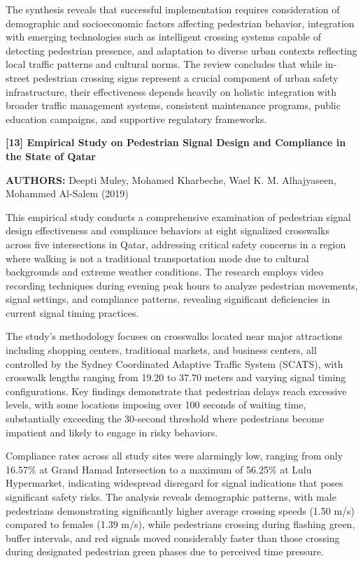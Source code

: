\documentclass[a4paper, 12pt]{report}
\begin{document}
The synthesis reveals that successful implementation requires consideration of demographic and socioeconomic factors affecting pedestrian behavior, integration with emerging technologies such as intelligent crossing systems capable of detecting pedestrian presence, and adaptation to diverse urban contexts reflecting local traffic patterns and cultural norms. The review concludes that while in-street pedestrian crossing signs represent a crucial component of urban safety infrastructure, their effectiveness depends heavily on holistic integration with broader traffic management systems, consistent maintenance programs, public education campaigns, and supportive regulatory frameworks.

\noindent \textbf{[13] Empirical Study on Pedestrian Signal Design and Compliance in the State of Qatar}

\textbf{AUTHORS:} Deepti Muley, Mohamed Kharbeche, Wael K. M. Alhajyaseen, Mohammed Al-Salem (2019)



This empirical study conducts a comprehensive examination of pedestrian signal design effectiveness and compliance behaviors at eight signalized crosswalks across five intersections in Qatar, addressing critical safety concerns in a region where walking is not a traditional transportation mode due to cultural backgrounds and extreme weather conditions. The research employs video recording techniques during evening peak hours to analyze pedestrian movements, signal settings, and compliance patterns, revealing significant deficiencies in current signal timing practices.

The study's methodology focuses on crosswalks located near major attractions including shopping centers, traditional markets, and business centers, all controlled by the Sydney Coordinated Adaptive Traffic System (SCATS), with crosswalk lengths ranging from 19.20 to 37.70 meters and varying signal timing configurations. Key findings demonstrate that pedestrian delays reach excessive levels, with some locations imposing over 100 seconds of waiting time, substantially exceeding the 30-second threshold where pedestrians become impatient and likely to engage in risky behaviors.

Compliance rates across all study sites were alarmingly low, ranging from only 16.57\% at Grand Hamad Intersection to a maximum of 56.25\% at Lulu Hypermarket, indicating widespread disregard for signal indications that poses significant safety risks. The analysis reveals demographic patterns, with male pedestrians demonstrating significantly higher average crossing speeds (1.50 m/s) compared to females (1.39 m/s), while pedestrians crossing during flashing green, buffer intervals, and red signals moved considerably faster than those crossing during designated pedestrian green phases due to perceived time pressure.
\end{document}
